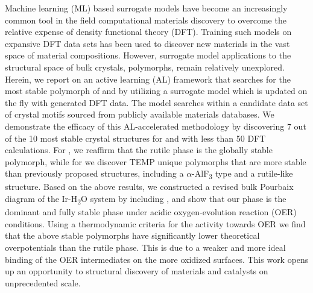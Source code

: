 %



%
Machine learning (ML) based surrogate models have become an increasingly common tool in the field computational materials discovery to overcome the relative expense of  density functional theory (DFT).
%
Training such models on expansive DFT data sets has been used to discover new materials in the vast space of material compositions. However, surrogate model applications to the structural space of bulk crystals,  polymorphs, remain relatively unexplored.
%
Herein, we report on an active learning (AL) framework that searches for the most stable polymorph of \IrOtwo and \IrOthree by utilizing a surrogate model which is updated on the fly with generated DFT data.
%
The model searches within a candidate data set of crystal motifs sourced from publicly available materials databases.
%
We demonstrate the efficacy of this AL-accelerated methodology by discovering 7 out of the 10 most stable crystal structures for \IrOtwo and \IrOthree with less than 50 DFT calculations.
%
For \IrOtwo, we reaffirm that the rutile phase is the globally stable polymorph,
while for \IrOthree we discover TEMP unique polymorphs that are more stable than previously proposed structures, including a $\alpha$-AlF\textsubscript{3} type and a rutile-like \IrOthree structure.
%
%
%
Based on the above results, we constructed a revised bulk Pourbaix diagram of the Ir-H\textsubscript{2}O system by including \IrOthree, and show that our \aIrOthree phase is the dominant and fully stable phase under acidic oxygen-evolution reaction (OER) conditions.
%
Using a thermodynamic criteria for the activity towards OER we find that the above stable \IrOthree polymorphs have significantly lower theoretical overpotentials than the rutile \IrOtwo phase.
%
This is due to a weaker and more ideal binding of the OER intermediates on the more oxidized \IrOthree surfaces.
%
This work opens up an opportunity to structural discovery of materials and catalysts on unprecedented scale.
